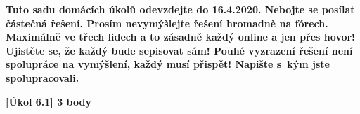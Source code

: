 \textbf{
	Tuto sadu domácích úkolů odevzdejte do 16.4.2020.
	Nebojte se posílat částečná řešení.
	Prosím nevymýšlejte řešení hromadně na fórech.
	Maximálně ve třech lidech a to zásadně každý online a jen přes hovor!
	Ujistěte se, že každý bude sepisovat sám!
	Pouhé vyzrazení řešení není spolupráce na vymýšlení, každý musí přispět!
	Napište s~kým jste spolupracovali.
}

\textbf{[Úkol 6.1] 3 body}


